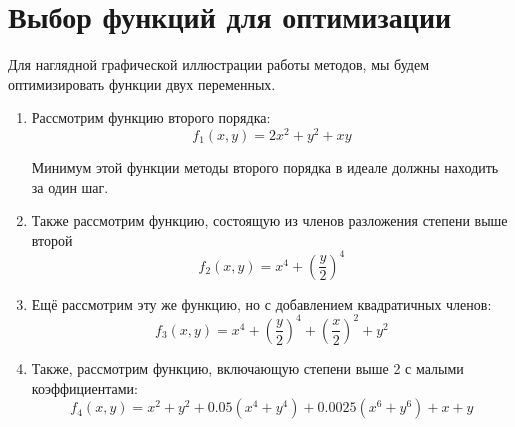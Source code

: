 \section{Выбор функций для оптимизации}
\label{sec:functions}

Для наглядной графической иллюстрации работы методов, мы будем оптимизировать функции двух переменных.

\begin{enumerate}

    \item Рассмотрим функцию второго порядка:
    \begin{equation}
        f_1(x, y) = 2x^2 + y^2 + xy
        \label{eq:func_1}
    \end{equation}

    Минимум этой функции методы второго порядка в идеале должны находить за один шаг.

    \item Также рассмотрим функцию, состоящую из членов разложения степени выше второй
    \begin{equation}
        f_2(x, y) = x^4 + (\frac{y}{2})^4
        \label{eq:func_2}
    \end{equation}

    \item Ещё рассмотрим эту же функцию, но с добавлением квадратичных членов:
    \begin{equation}
        f_3(x, y) = x^4 + (\frac{y}{2})^4 + (\frac{x}{2})^2 + y^2
        \label{eq:func_3}
    \end{equation}

    \item Также, рассмотрим функцию, включающую степени выше 2 с малыми коэффициентами:
    \begin{equation}
        f_4(x, y)=x^{2}+y^{2}+0.05(x^{4}+y^{4})+0.0025(x^{6}+y^{6})+x+y
        \label{eq:func_4}
    \end{equation}

\end{enumerate}